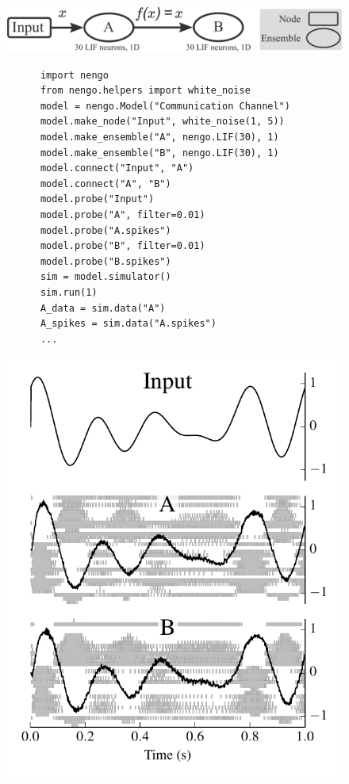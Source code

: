 \documentclass{frontiersSCNS}
\begin{document}
\begin{figure}
\begin{center}
  \includegraphics[width=.9\textwidth]{comm_channel}
  \begin{minipage}{0.58\textwidth}
    \begin{lstlisting}
      import nengo
      from nengo.helpers import white_noise
      model = nengo.Model("Communication Channel")
      model.make_node("Input", white_noise(1, 5))
      model.make_ensemble("A", nengo.LIF(30), 1)
      model.make_ensemble("B", nengo.LIF(30), 1)
      model.connect("Input", "A")
      model.connect("A", "B")
      model.probe("Input")
      model.probe("A", filter=0.01)
      model.probe("A.spikes")
      model.probe("B", filter=0.01)
      model.probe("B.spikes")
      sim = model.simulator()
      sim.run(1)
      A_data = sim.data("A")
      A_spikes = sim.data("A.spikes")
      ...
    \end{lstlisting}
  \end{minipage}
  \begin{minipage}{0.37\textwidth}
    \includegraphics[width=\textwidth]{comm_channel_res}

\end{minipage}
\end{center}
\end{figure}
\end{document}
